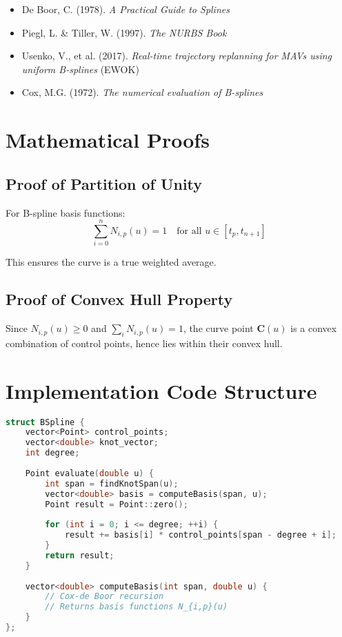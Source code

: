 \documentclass[12pt,a4paper]{article}
\begin{document}
\begin{itemize}
    \item De Boor, C. (1978). \textit{A Practical Guide to Splines}
    \item Piegl, L. \& Tiller, W. (1997). \textit{The NURBS Book}
    \item Usenko, V., et al. (2017). \textit{Real-time trajectory replanning for MAVs using uniform B-splines} (EWOK)
    \item Cox, M.G. (1972). \textit{The numerical evaluation of B-splines}
\end{itemize}

\appendix

\section{Mathematical Proofs}

\subsection{Proof of Partition of Unity}

For B-spline basis functions:
\begin{equation}
    \sum_{i=0}^{n} N_{i,p}(u) = 1 \quad \text{for all } u \in [t_p, t_{n+1}]
\end{equation}

This ensures the curve is a true weighted average.

\subsection{Proof of Convex Hull Property}

Since $N_{i,p}(u) \geq 0$ and $\sum_i N_{i,p}(u) = 1$, the curve point $\mathbf{C}(u)$ is a convex combination of control points, hence lies within their convex hull.

\section{Implementation Code Structure}

\begin{lstlisting}[language=C++, caption=B-Spline Evaluation Pseudocode]
struct BSpline {
    vector<Point> control_points;
    vector<double> knot_vector;
    int degree;
    
    Point evaluate(double u) {
        int span = findKnotSpan(u);
        vector<double> basis = computeBasis(span, u);
        Point result = Point::zero();
        
        for (int i = 0; i <= degree; ++i) {
            result += basis[i] * control_points[span - degree + i];
        }
        return result;
    }
    
    vector<double> computeBasis(int span, double u) {
        // Cox-de Boor recursion
        // Returns basis functions N_{i,p}(u)
    }
};
\end{lstlisting}
\end{document}
